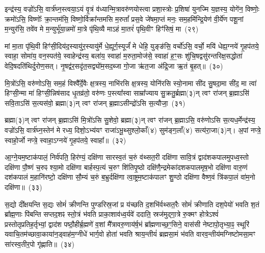 {\anuvakamend[{अ॒ग्नेस्तैका॑\-दश च}]}%

इन्द्र॑स्य॒ वज्रो॑\-ऽसि॒ वार्त्र॑घ्न॒स्त्वया॒\-ऽयं वृ॒त्रं व॑ध्यान्मि॒त्रावरु॑ण\-योस्त्वा प्रशा॒स्त्रोः प्र॒शिषा॑ युनज्मि य॒ज्ञस्य॒ योगे॑न॒ विष्णोः॒ क्रमो॑\-ऽसि॒ विष्णोः᳚ क्रा॒न्तम॑सि॒ विष्णो॒र्विक्रा᳚न्तमसि म॒रुतां᳚ प्रस॒वे जे॑षमा॒प्तं मनः॒ सम॒हमि॑न्द्रि॒येण॑ वी॒र्ये॑ण पशू॒नां म॒न्युर॑सि॒ तवे॑व मे म॒न्युर्भू॑या॒न्नमो॑ मा॒त्रे पृ॑थि॒व्यै मा\-ऽहं मा॒तरं॑ पृथि॒वीꣳ हिꣳ॑सिषं॒ मा~(२९)

मां मा॒ता पृ॑थि॒वी हिꣳ॑सी॒दिय॑द॒स्यायु॑र॒स्यायु॑र्मे धे॒ह्यूर्ग॒स्यूर्जं॑ मे धेहि॒ युङ्ङ॑सि॒ वर्चो॑\-ऽसि॒ वर्चो॒ मयि॑ धेह्य॒ग्नये॑ गृ॒हप॑तये॒ स्वाहा॒ सोमा॑य॒ वन॒स्पत॑ये॒ स्वाहेन्द्र॑स्य॒ बला॑य॒ स्वाहा॑ म॒रुता॒मोज॑से॒ स्वाहा॑ ह॒ꣳ॒सः शु॑चि॒षद्वसु॑रन्तरिक्ष॒\-सद्धोता॑ वेदि॒षदति॑थिर्दुरोण॒सत्। नृ॒षद्व॑र॒सदृ॑त॒सद्व्यो॑म॒सद॒ब्जा गो॒जा ऋ॑त॒जा अ॑द्रि॒जा ऋ॒तं बृ॒हत्॥~(३०)

{\anuvakamend[{हि॒ꣳ॒सि॒षं॒ मर्त॒जास्त्रीणि॑ च}]}%

मि॒त्रो॑\-ऽसि॒ वरु॑णो\-ऽसि॒ सम॒हं विश्वै᳚र्दे॒वैः क्ष॒त्रस्य॒ नाभि॑रसि क्ष॒त्रस्य॒ योनि॑रसि स्यो॒नामा सी॑द सु॒षदा॒मा सी॑द॒ मा त्वा॑ हिꣳसी॒न्मा मा॑ हिꣳसी॒न्निष॑साद धृ॒तव्र॑तो॒ वरु॑णः प॒स्त्या᳚स्वा साम्रा᳚ज्याय सु॒क्रतु॒र्ब्रह्मा(३)न् त्वꣳ रा॑जन् ब्र॒ह्मा\-ऽसि॑ सवि॒ता\-ऽसि॑ स॒त्यस॑वो॒ ब्रह्मा(३)न् त्वꣳ रा॑जन् ब्र॒ह्मा\-ऽसीन्द्रो॑\-ऽसि स॒त्यौजा॒~(३१)

ब्रह्मा(३)न् त्वꣳ रा॑जन् ब्र॒ह्मा\-ऽसि॑ मि॒त्रो॑\-ऽसि सु॒शेवो॒ ब्रह्मा(३)न् त्वꣳ रा॑जन् ब्र॒ह्मा\-ऽसि॒ वरु॑णो\-ऽसि स॒त्यध॒र्मेन्द्र॑स्य॒ वज्रो॑\-ऽसि॒ वार्त्र॑घ्न॒स्तेन॑ मे रध्य॒ दिशो॒\-ऽभ्य॑यꣳ राजा॑\-ऽभू॒थ्सुश्लो॒काँ(४) सुम॑ङ्ग॒लाँ(४) सत्य॑रा॒जा(३)न्। अ॒पां नप्त्रे॒ स्वाहो॒र्जो नप्त्रे॒ स्वाहा॒\-ऽग्नये॑ गृ॒हप॑तये॒ स्वाहा᳚॥~(३२)

{\anuvakamend[{स॒त्यौजा᳚श्चत्वारि॒ꣳ॒शच्च॑}]}%

आ॒ग्ने॒यम॒ष्टा\-क॑पालं॒ निर्व॑पति॒ हिर॑ण्यं॒ दक्षि॑णा सारस्व॒तं च॒रुं व॑थ्सत॒री दक्षि॑णा सावि॒त्रं द्वाद॑श\-कपालमुपध्व॒स्तो दक्षि॑णा पौ॒ष्णं च॒रुꣴ श्या॒मो दक्षि॑णा बार्\mbox{}हस्प॒त्यं च॒रुꣳ शि॑तिपृ॒ष्ठो दक्षि॑णै॒न्द्रमेका॑\-दश\-कपालमृष॒भो दक्षि॑णा वारु॒णं दश॑\-कपालं म॒हानि॑रष्टो॒ दक्षि॑णा सौ॒म्यं च॒रुं ब॒भ्रुर्दक्षि॑णा त्वा॒ष्ट्रम॒ष्टाक॑पालꣳ शु॒ण्ठो दक्षि॑णा वैष्ण॒वं त्रि॑कपा॒लं वा॑म॒नो दक्षि॑णा॥~(३३)

{\anuvakamend[{आ॒ग्ने॒यं द्विच॑त्वारिꣳशत्}]}%

स॒द्यो दी᳚क्षयन्ति स॒द्यः सोमं॑ क्रीणन्ति पुण्डरिस्र॒जां प्र य॑च्छति द॒शभि॑र्वथ्सत॒रैः सोमं॑ क्रीणाति दश॒पेयो॑ भवति श॒तं ब्रा᳚ह्म॒णाः पि॑बन्ति सप्तद॒शꣴ स्तो॒त्रं भ॑वति प्राका॒शाव॑ध्व॒र्यवे॑ ददाति॒ स्रज॑मुद्गा॒त्रे रु॒क्मꣳ होत्रे\-ऽश्वं॑ प्रस्तोतृप्रतिह॒र्तृभ्यां॒ द्वाद॑श पष्ठौ॒हीर्ब्र॒ह्मणे॑ व॒शां मै᳚त्रावरु॒णाय॑र्\mbox{}ष॒भं ब्रा᳚ह्मणाच्छ॒ꣳ॒सिने॒ वास॑सी नेष्टापो॒तृभ्या॒ꣴ॒ स्थूरि॑ यवाचि॒तम॑च्छावा॒काया॑न॒ड्वाह॑म॒ग्नीधे॑ भार्ग॒वो होता॑ भवति श्राय॒न्तीयं॑ ब्रह्मसा॒मं भ॑वति वारव॒न्तीय॑मग्निष्टोमसा॒मꣳ सा॑रस्व॒तीर॒पो गृ॑ह्णाति॥~(३४)

